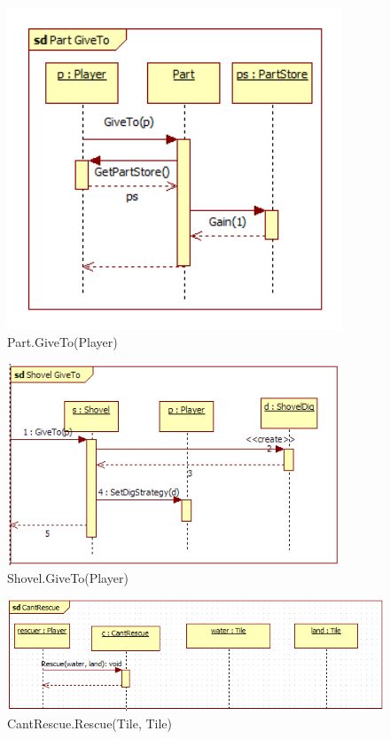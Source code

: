 \begin{figure}[H]
	\begin{center}
		\includegraphics[width=10cm]{chapters/chapter03/seqdiag/Part_GiveTo.png}
		\caption{Part.GiveTo(Player)}
		\label{fig:PartGiveTo}
	\end{center}
\end{figure}
\begin{figure}[H]
	\begin{center}
		\includegraphics[width=10cm]{chapters/chapter03/seqdiag/Shovel_GiveTo.png}
		\caption{Shovel.GiveTo(Player)}
		\label{fig:ShovelGiveTo}
	\end{center}
\end{figure}
\begin{figure}[H]
	\begin{center}
		\includegraphics[width=13cm]{chapters/chapter03/seqdiag/CantRescue_Rescue.png}
		\caption{CantRescue.Rescue(Tile, Tile)}
		\label{fig:CantRescueRescue}
	\end{center}
\end{figure}
